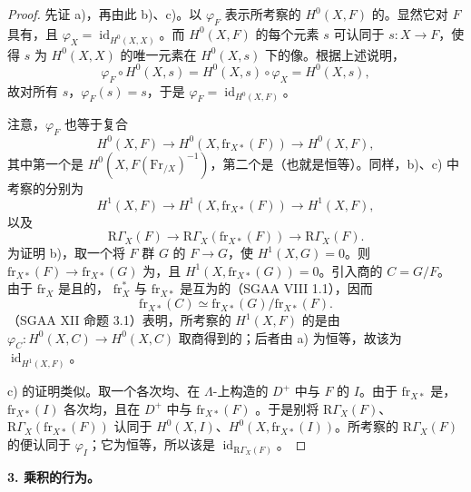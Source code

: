 \begin{proof}
先证 a)，再由此 b)、c)。以 $\varphi_F$ 表示所考察的 $H^0(X,F)$ 的。显然它对 $F$ 具有，且 $\varphi_X=\operatorname{id}_{H^0(X,X)}$。而 $H^0(X,F)$ 的每个元素 $s$ 可认同于 $s:X\to F$，使得 $s$ 为 $H^0(X,X)$ 的唯一元素在 $H^0(X,s)$ 下的像。根据上述说明，
\[
\varphi_F\circ H^0(X,s)=H^0(X,s)\circ\varphi_X=H^0(X,s),
\]
故对所有 $s$，$\varphi_F(s)=s$，于是 $\varphi_F=\operatorname{id}_{H^0(X,F)}$。

注意，$\varphi_F$ 也等于复合
\[
H^0(X,F)\longrightarrow H^0(X,\mathrm{fr}_{X*}(F))\longrightarrow H^0(X,F),
\]
其中第一个是 $H^0(X,F(\mathrm{Fr}_{/X})^{-1})$，第二个是（也就是恒等）。同样，b)、c) 中考察的分别为
\[
H^1(X,F)\longrightarrow H^1(X,\mathrm{fr}_{X*}(F))\longrightarrow H^1(X,F),
\]
以及
\[
\mathrm R\Gamma_X(F)\longrightarrow\mathrm R\Gamma_X(\mathrm{fr}_{X*}(F))\longrightarrow\mathrm R\Gamma_X(F).
\]
为证明 b)，取一个将 $F$ 群 $G$ 的 $F\to G$，使 $H^1(X,G)=0$。则 $\mathrm{fr}_{X*}(F)\to\mathrm{fr}_{X*}(G)$ 为，且 $H^1(X,\mathrm{fr}_{X*}(G))=0$。引入商的 $C=G/F$。
由于 $\mathrm{fr}_X$ 是且的， $\mathrm{fr}_X^*$ 与 $\mathrm{fr}_{X*}$ 是互为的（SGAA VIII  1.1），因而
\[
\mathrm{fr}_{X*}(C)\simeq\mathrm{fr}_{X*}(G)/\mathrm{fr}_{X*}(F).
\]
（SGAA XII 命题 3.1）表明，所考察的 $H^1(X,F)$ 的是由 $\varphi_C:H^0(X,C)\to H^0(X,C)$ 取商得到的；后者由 a) 为恒等，故该为 $\operatorname{id}_{H^1(X,F)}$。

c) 的证明类似。取一个各次均、在 $\Lambda$-上构造的 $D^+$ 中与 $F$ 的 $I$。由于 $\mathrm{fr}_{X*}$ 是，$\mathrm{fr}_{X*}(I)$ 各次均，且在 $D^+$ 中与 $\mathrm{fr}_{X*}(F)$ 。于是别将 $\mathrm R\Gamma_X(F)$、$\mathrm R\Gamma_X(\mathrm{fr}_{X*}(F))$ 认同于 $H^0(X,I)$、$H^0(X,\mathrm{fr}_{X*}(I))$。所考察的 $\mathrm R\Gamma_X(F)$ 的便认同于 $\varphi_I$；它为恒等，所以该是 $\operatorname{id}_{\mathrm R\Gamma_X(F)}$。
\end{proof}
\textbf{3. 乘积的行为。}

